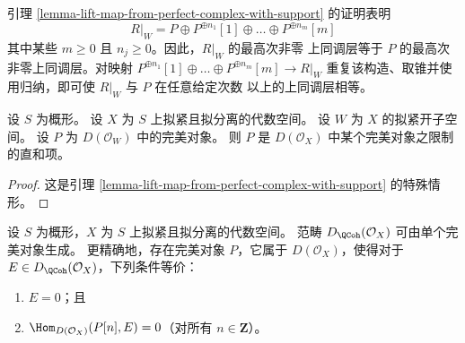 \begin{remark}
\label{remark-addendum}
引理 \ref{lemma-lift-map-from-perfect-complex-with-support} 的证明表明
$$
R|_W = P \oplus P^{\oplus n_1}[1] \oplus \ldots \oplus P^{\oplus n_m}[m]
$$
其中某些 $m \geq 0$ 且 $n_j \geq 0$。因此，$R|_W$ 的最高次非零
上同调层等于 $P$ 的最高次非零上同调层。对映射
$P^{\oplus n_1}[1] \oplus \ldots \oplus P^{\oplus n_m}[m] \to R|_W$
重复该构造、取锥并使用归纳，即可使 $R|_W$ 与 $P$ 在任意给定次数
以上的上同调层相等。
\end{remark}

\begin{lemma}
\label{lemma-direct-summand-of-a-restriction}
设 $S$ 为概形。
设 $X$ 为 $S$ 上拟紧且拟分离的代数空间。
设 $W$ 为 $X$ 的拟紧开子空间。
设 $P$ 为 $D(\mathcal{O}_W)$ 中的完美对象。
则 $P$ 是 $D(\mathcal{O}_X)$ 中某个完美对象之限制的直和项。
\end{lemma}

\begin{proof}
这是引理 \ref{lemma-lift-map-from-perfect-complex-with-support} 的特殊情形。
\end{proof}

\begin{theorem}
\label{theorem-bondal-van-den-Bergh}
设 $S$ 为概形，$X$ 为 $S$ 上拟紧且拟分离的代数空间。
范畴 $D_\QCoh(\mathcal{O}_X)$ 可由单个完美对象生成。
更精确地，存在完美对象 $P$，它属于 $D(\mathcal{O}_X)$，使得对于
$E \in D_\QCoh(\mathcal{O}_X)$，下列条件等价：
\begin{enumerate}
\item $E = 0$；且
\item $\Hom_{D(\mathcal{O}_X)}(P[n], E) = 0$（对所有
$n \in \mathbf{Z}$）。
\end{enumerate}
\end{theorem}

